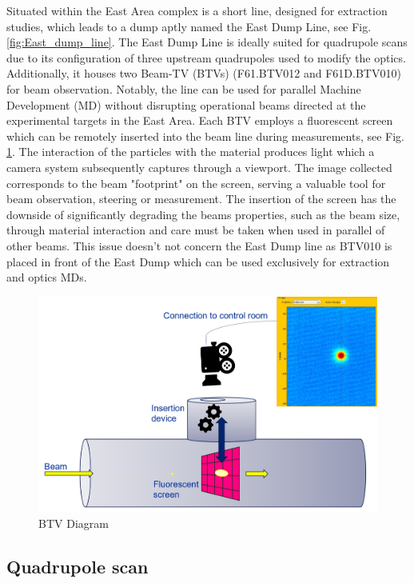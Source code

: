 Situated within the East Area complex is a short line, designed for extraction studies, which leads to a dump aptly named the East Dump Line, see Fig. \ref{fig:East_dump_line}. The East Dump Line is ideally suited for quadrupole scans due to its configuration of three upstream quadrupoles used to modify the optics. Additionally, it houses two Beam-TV (BTVs) (F61.BTV012 and F61D.BTV010) for beam observation. Notably, the line can be used for parallel Machine Development (MD) without disrupting operational beams directed at the experimental targets in the East Area. Each BTV employs a fluorescent screen which can be remotely inserted into the beam line during measurements, see Fig. \ref{fig:btv_diagram}. The interaction of the particles with the material produces light which a camera system subsequently captures through a viewport. The image collected corresponds to the beam "footprint" on the screen, serving a valuable tool for beam observation, steering or measurement. The insertion of the screen has the downside of significantly degrading the beams properties, such as the beam size, through material interaction and care must be taken when used in parallel of other beams. This issue doesn't not concern the East Dump line as BTV010 is placed in front of the East Dump which can be used exclusively for extraction and optics MDs.

\begin{figure}[htbp]
\centering
\includegraphics[width=0.7\linewidth]{03_Empirical_Measurements/images/BTV_diagram.jpg}
\caption{BTV Diagram}
\label{fig:btv_diagram}
\end{figure}

\subsection{Quadrupole scan}
\label{Quadrupole Scan}



